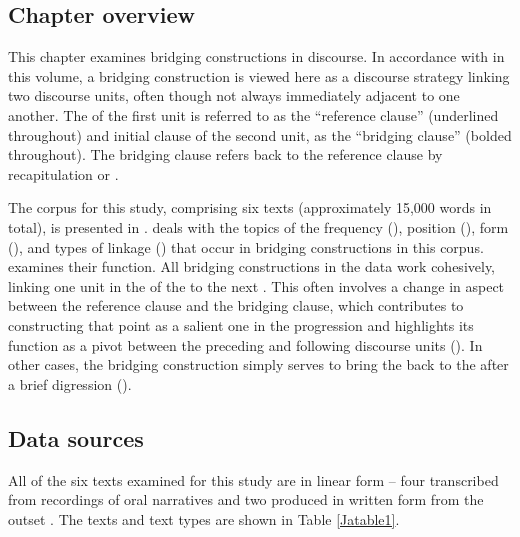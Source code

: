 \documentclass[output=paper]{LSP/langsci}
\begin{document}
\subsection{Chapter overview}
This chapter examines bridging constructions in   discourse. In accordance with \citeauthor{guerin18} in this volume, a bridging construction is viewed here as a discourse  strategy linking two discourse units, often though not always immediately adjacent to one another. The  of the first unit is referred to as the ``reference clause'' (underlined throughout) and initial clause of the second unit, as the ``bridging clause'' (bolded throughout). The bridging clause refers back to the reference clause by recapitulation or .

The corpus for this study, comprising six  texts (approximately 15,000 words in total), is presented in .  deals with the topics of the frequency (), position (), form (), and types of linkage () that occur in bridging constructions in this corpus.  examines their function. All bridging constructions in the data work cohesively, linking one unit in the  of the  to the next \citep[][14--17]{longacre83}. This often involves a change in aspect between the reference clause and the bridging clause, which contributes to constructing that point as a salient one in the  progression and highlights its function as a pivot between the preceding and following discourse units (). In other cases, the bridging construction simply serves to bring the  back to the  after a brief digression ().
%
%
\subsection{Data sources}
\label{JaData}
All of the six  texts examined for this study are in linear  form -- four transcribed from recordings of oral narratives 
\citep{fuller85,johnson92} and two produced in written form from the outset \citep{vang90}. The texts and text types are shown in Table \ref{Jatable1}. 
\end{document}
